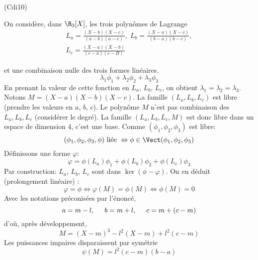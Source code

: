 \begin{tiny}(Cdi10)\end{tiny} On considère, dans $\R_3[X]$, les trois polynômes de Lagrange 
\begin{multline*}
 L_a = \frac{(X-b)(X-c)}{(a-b)(a-c)},\;
 L_b = \frac{(X-a)(X-c)}{(b-a)(b-c)}, \\
 L_c = \frac{(X-a)(X-b)}{(c-a)(c-B)} 
\end{multline*}

et une combinaison nulle des trois formes linéaires.
\begin{displaymath}
 \lambda_1\phi_1 + \lambda_2 \phi_2 + \lambda_3 \phi_3
\end{displaymath}
En prenant la valeur de cette fonction en $L_a$, $L_b$, $L_c$, on obtient
$\lambda_1 = \lambda_2 = \lambda_3$.\newline
Notons $M=(X-a)(X-b)(X-c)$. La famille $(L_a,L_b,L_c)$ est libre (prendre les valeurs en $a$, $b$, $c$). Le polynôme $M$ n'est pas combinaison des $L_a, L_b, L_c$ (considérer le degré). La famille $(L_a,L_b,L_c,M)$ est donc libre dans un espace de dimension $4$, c'est une base.\newline
Comme $(\phi_1,\phi_2,\phi_3)$ est libre:
\begin{displaymath}
  (\phi_1,\phi_2,\phi_3,\phi)\text{ liée } \Leftrightarrow \phi\in \Vect(\phi_1,\phi_2,\phi_3)
\end{displaymath}
Définissons une forme $\varphi$:
\begin{displaymath}
 \varphi = \phi(L_a)\phi_1 + \phi(L_b)\phi_2 + \phi(L_c)\phi_3 
\end{displaymath}
Par construction: $L_a$, $L_b$, $L_c$ sont dans $\ker(\phi - \varphi)$. On en déduit (prolongement linéaire) :
\begin{displaymath}
 \varphi = \phi \Leftrightarrow \varphi(M)=\phi(M) \Leftrightarrow \phi(M) = 0
\end{displaymath}
Avec les notations préconisées par l'énoncé,
\begin{displaymath}
 a=m-l,\hspace{0.5cm} b=m+l,\hspace{0.5cm} c = m + (c-m)
\end{displaymath}
d'où, après développement,
\begin{displaymath}
 M = (X-m)^3 -l^2(X-m) + l^2(c-m)
\end{displaymath}
Les puissances impaires disparaissent par symétrie
\begin{displaymath}
 \psi(M) = l^2(c-m)(b-a)
\end{displaymath}


